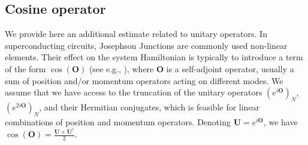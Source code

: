 \documentclass[a4paper,onecolumn,amsmath,amssymb,amsfonts,accepted=2026-03-06]{quantumarticle}
\newcommand{\Uop}{\mathbf{U}}
\begin{document}
\subsection{Cosine operator}
\label{app-cos.tex}
We provide here an additional estimate related to unitary operators. In superconducting circuits, Josephson Junctions \cite{JOSEPHSON1962251} are commonly used non-linear elements. Their effect on the system Hamiltonian is typically to introduce a term of the form $\cos(\mathbf{O})$ (see e.g., \cite{devoretcQED}), where $\mathbf{O}$ is a self-adjoint operator, usually a sum of position and/or momentum operators acting on different modes. We assume that we have access to the truncation of the unitary operators $(e^{i\mathbf{O}})_N$, $(e^{2i\mathbf{O}})_N$, and their Hermitian conjugates, which is feasible for linear combinations of position and momentum operators. Denoting $\Uop=e^{i\mathbf{O}}$, we have $\cos(\mathbf{O}) = \frac{ \Uop + \Uop^\dag}{2}$.
\end{document}
